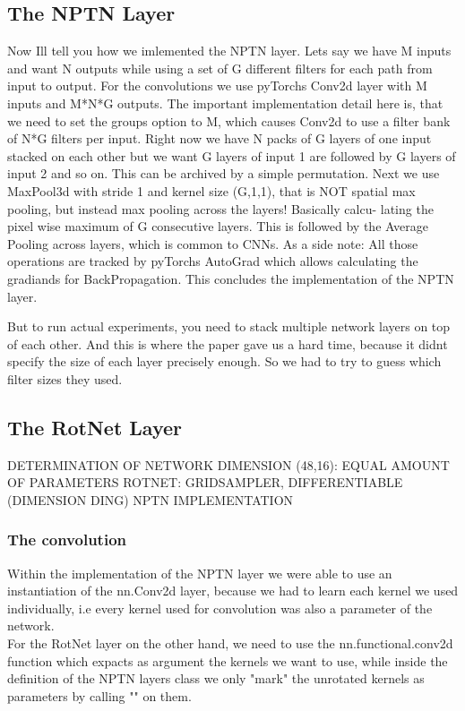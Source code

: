 \documentclass{llncs}
\begin{document}
\subsection{The NPTN Layer}
Now Ill tell you how we imlemented the NPTN layer. Lets say we have M inputs
and want N outputs while using a set of G different filters for each path from
input to output. For the convolutions we use pyTorchs Conv2d layer with M
inputs and M*N*G outputs. The important implementation detail here is, that
we need to set the groups option to M, which causes Conv2d to use a filter bank
of N*G filters per input.
Right now we have N packs of G layers of one input stacked on each other
but we want G layers of input 1 are followed by G layers of input 2 and so on.
This can be archived by a simple permutation.
Next we use MaxPool3d with stride 1 and kernel size (G,1,1), that is NOT
spatial max pooling, but instead max pooling across the layers! Basically calcu-
lating the pixel wise maximum of G consecutive layers.
This is followed by the Average Pooling across layers, which is common to
CNNs.
As a side note: All those operations are tracked by pyTorchs AutoGrad which
allows calculating the gradiands for BackPropagation.
This concludes the implementation of the NPTN layer.

But to run actual experiments, you need to stack multiple network layers on
top of each other. And this is where the paper gave us a hard time, because it
didnt specify the size of each layer precisely enough. So we had to try to guess
which filter sizes they used.

\subsection{The RotNet Layer}
DETERMINATION OF NETWORK DIMENSION (48,16): EQUAL AMOUNT
OF PARAMETERS
ROTNET: GRIDSAMPLER, DIFFERENTIABLE
(DIMENSION DING)
NPTN IMPLEMENTATION

\subsubsection{The convolution}
Within the implementation of the NPTN layer we were able to use an instantiation of the nn.Conv2d layer, because we had to learn each kernel we used individually, i.e every kernel used for convolution was also a parameter of the network.\\
For the RotNet layer on the other hand, we need to use the nn.functional.conv2d function which expacts as argument the kernels we want to use, while inside the definition of the NPTN layers class we only "mark" the unrotated kernels as parameters by calling "" on them.
\end{document}
